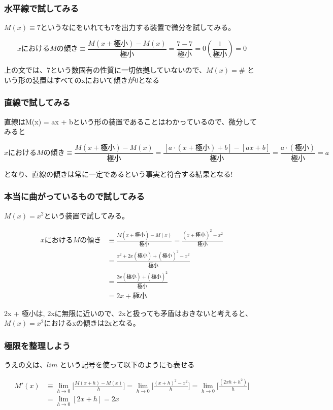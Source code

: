 \documentclass[dvipdfmx]{jsarticle}
\begin{document}
\subsubsection{水平線で試してみる}

$M(x) \equiv 7$というなにをいれても7を出力する装置で微分を試してみる。

\[ xにおけるMの傾き \equiv \frac{M(x + 極小) - M(x)}{極小} = \frac{7-7}{極小} = 0(\frac{1}{極小}) = 0 \]

上の文では、7という数固有の性質に一切依拠していないので、$M(x) = \#$ という形の装置はすべてのxにおいて傾きが0となる


\subsubsection{直線で試してみる}

直線はM(x) = ax + bという形の装置であることはわかっているので、微分してみると

\[ xにおけるMの傾き \equiv \frac{M(x + 極小) - M(x)}{極小} = \frac{[a \cdot (x + 極小) + b] - [ax + b]}{極小} = \frac{a \cdot (極小)}{極小} = a \]

となり、直線の傾きは常に一定であるという事実と符合する結果となる!

\subsubsection{本当に曲がっているもので試してみる}

$M(x) = x^2$という装置で試してみる。

\begin{align*}
  xにおけるMの傾き &\equiv \frac{M(x + 極小) - M(x)}{極小} = \frac{(x + 極小)^2 - x^2}{極小} \\
  &= \frac{x^2 + 2x(極小) + (極小)^2 - x^2}{極小} \\
  &= \frac{2x(極小) + (極小)^2}{極小} \\
  &= 2x + 極小
\end{align*}

2x + 極小は, 2xに無限に近いので、2xと扱っても矛盾はおきないと考えると、$M(x) = x^2$におけるxの傾きは2xとなる。

\subsubsection{極限を整理しよう}

うえの文は、$lim$ という記号を使って以下のようにも表せる

\begin{align*}
  M'(x) &\equiv \lim_{h \to 0} \biggl[ \frac{M(x+h)-M(x)}{h}\biggr] = \lim_{h \to 0} \biggl[ \frac{(x+h)^2 -x^2}{h}\biggr] = \lim_{h \to 0} \biggl[ \frac{(2xh + h^2)}{h}\biggr] \\
  &= \lim_{h \to 0}[2x +h] = 2x
\end{align*}
\end{document}
